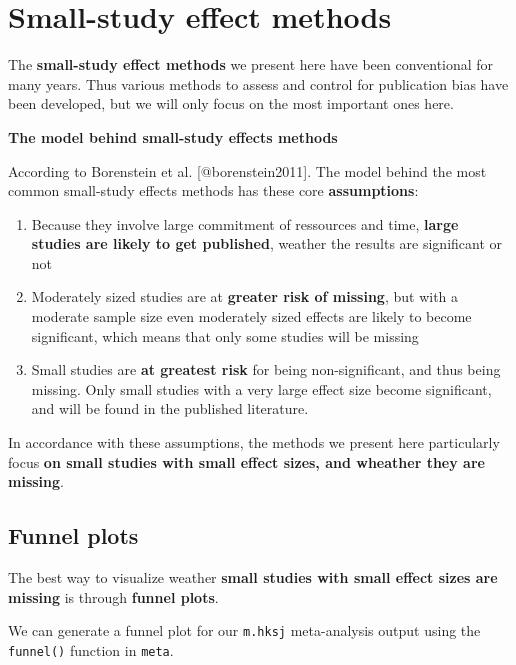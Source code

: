 \documentclass[]{book}
\providecommand{\tightlist}{%
  \setlength{\itemsep}{0pt}\setlength{\parskip}{0pt}}
\begin{document}
\hypertarget{smallstudyeffects}{%
\section{Small-study effect methods}\label{smallstudyeffects}}

The \textbf{small-study effect methods} we present here have been conventional for many years. Thus various methods to assess and control for publication bias have been developed, but we will only focus on the most important ones here.

\begin{rmdinfo}
\textbf{The model behind small-study effects methods}

According to Borenstein et al. {[}@borenstein2011{]}. The model behind
the most common small-study effects methods has these core
\textbf{assumptions}:

\begin{enumerate}
.{enumi{enumi}.}
\tightlist
\item
  Because they involve large commitment of ressources and time,
  \textbf{large studies are likely to get published}, weather the
  results are significant or not
\item
  Moderately sized studies are at \textbf{greater risk of missing}, but
  with a moderate sample size even moderately sized effects are likely
  to become significant, which means that only some studies will be
  missing
\item
  Small studies are \textbf{at greatest risk} for being non-significant,
  and thus being missing. Only small studies with a very large effect
  size become significant, and will be found in the published
  literature.
\end{enumerate}

In accordance with these assumptions, the methods we present here
particularly focus \textbf{on small studies with small effect sizes, and
wheather they are missing}.
\end{rmdinfo}

\hypertarget{funnel-plots}{%
\subsection{Funnel plots}\label{funnel-plots}}

The best way to visualize weather \textbf{small studies with small effect sizes are missing} is through \textbf{funnel plots}.

We can generate a funnel plot for our \texttt{m.hksj} meta-analysis output using the \texttt{funnel()} function in \texttt{meta}.
\end{document}
